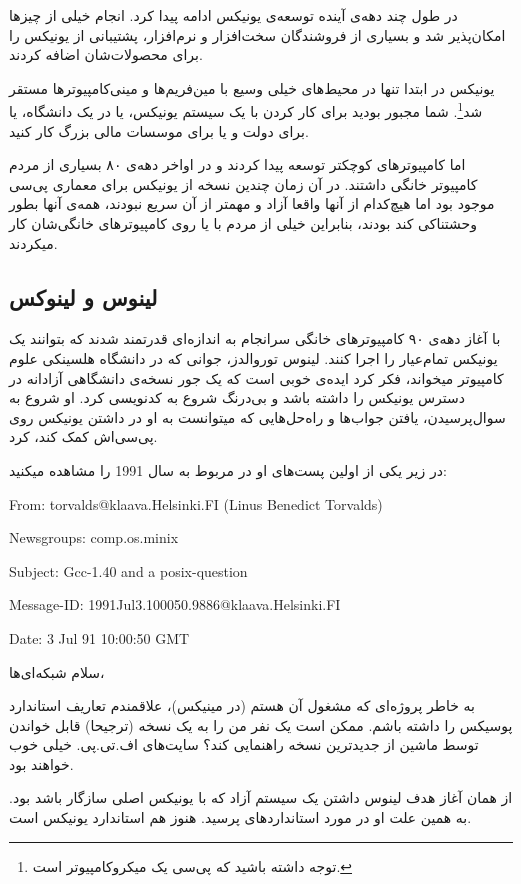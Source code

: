 در طول چند دهه‌ی آینده توسعه‌ی یونیکس ادامه پیدا کرد. انجام خیلی از چیزها امکان‌پذیر شد و بسیاری از فروشندگان سخت‌افزار و نرم‌افزار، پشتیبانی از یونیکس را برای محصولات‌شان اضافه کردند.

یونیکس در ابتدا تنها در محیط‌های خیلی وسیع با مین‌فریم‌ها و مینی‌کامپیوتر‌ها مستقر شد\footnote{توجه داشته باشید که پی‌سی یک میکروکامپیوتر است.}. شما مجبور بودید برای کار کردن با یک سیستم یونیکس، یا در یک دانشگاه، یا برای دولت و یا برای موسسات مالی بزرگ کار کنید.

اما کامپیوترهای کوچکتر توسعه پیدا کردند و در اواخر دهه‌ی ۸۰ بسیاری از مردم کامپیوتر خانگی داشتند. در آن زمان چندین نسخه از یونیکس برای معماری پی‌سی موجود بود اما هیچ‌کدام از آنها واقعا آزاد و مهمتر از آن سریع نبودند، همه‌ی آنها بطور وحشتناکی کند بودند، بنابراین خیلی از مردم با 
 یا 
 روی کامپیوترهای خانگی‌شان کار میکردند.
\subsection*{لینوس و لینوکس}
با آغاز دهه‌ی ۹۰ کامپیوترهای خانگی سرانجام به اندازه‌ای قدرتمند شدند که بتوانند یک یونیکس تمام‌عیار را اجرا کنند. لینوس توروالدز، جوانی که در دانشگاه هلسینکی علوم کامپیوتر میخواند، فکر کرد ایده‌ی خوبی است که یک جور نسخه‌ی دانشگاهی آزادانه در دسترس یونیکس را داشته باشد و بی‌درنگ شروع به کدنویسی کرد.
او شروع به سوال‌پرسیدن، یافتن جواب‌ها و راه‌حل‌هایی که میتوانست به او در داشتن یونیکس روی پی‌سی‌اش کمک کند، کرد. 

در زیر یکی از اولین پست‌های او در 
 مربوط به سال 1991 را مشاهده میکنید:
\begin{mdframed} 
\begin{eng}
From: torvalds@klaava.Helsinki.FI (Linus Benedict Torvalds)
	
Newsgroups: comp.os.minix
	
Subject: Gcc-1.40 and a posix-question
	
Message-ID: 1991Jul3.100050.9886@klaava.Helsinki.FI
	
Date: 3 Jul 91 10:00:50 GMT
\end{eng}
 سلام شبکه‌ای‌ها،
 
به خاطر پروژه‌ای که مشغول آن هستم (در مینیکس)، علاقمندم تعاریف استاندارد پوسیکس را داشته باشم. ممکن است یک نفر من را به یک نسخه (ترجیحا) قابل خواندن توسط ماشین از جدیدترین نسخه راهنمایی کند؟ سایت‌های اف.تی.پی. خیلی خوب خواهند بود. 
\end{mdframed}

از همان آغاز هدف لینوس داشتن یک سیستم آزاد که با یونیکس اصلی سازگار باشد بود. به همین علت او در مورد استانداردهای 
 پرسید.
 هنوز هم استاندارد یونیکس است.
 
